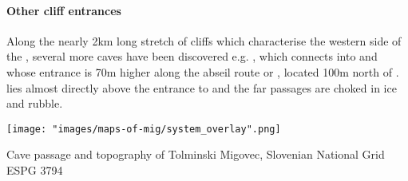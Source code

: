 \paragraph{Other cliff entrances} Along the nearly 2km long stretch of cliffs which characterise the western side of the , several more caves have been discovered e.g. , which connects into  and whose entrance is 70m higher along the abseil route or , located 100m north of .  lies almost directly above the entrance to  and the far passages are choked in ice and rubble.

\begin{pagemap}
 \checkoddpage \ifoddpage \forcerectofloat \else \forceversofloat \fi
\centering
  \texttt{[image: "images/maps-of-mig/system\_overlay".png]}
  \caption{Cave passage and topography of Tolminski Migovec, Slovenian National Grid ESPG 3794}
   \label{map:map overlay}
 \end{pagemap}